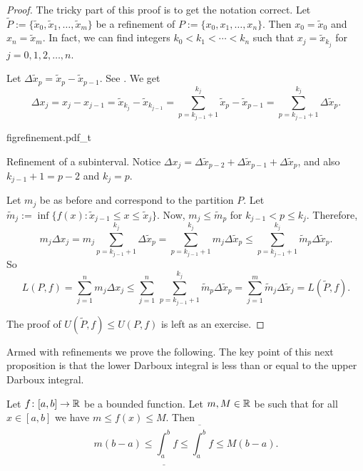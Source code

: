 \begin{proof}
The tricky part of this proof is to get the notation correct.
Let $\widetilde{P} := \{ \widetilde{x}_0, \widetilde{x}_1, \ldots,
\widetilde{x}_m \}$ be
a refinement of 
$P := \{ x_0, x_1, \ldots, x_n \}$.  Then
$x_0 = \widetilde{x}_0$ and 
$x_n = \widetilde{x}_m$.  In fact, we can find integers
$k_0 < k_1 < \cdots < k_n$ such that $x_j = \widetilde{x}_{k_j}$ for
$j=0,1,2,\ldots,n$.

Let $\Delta \widetilde{x}_p = \widetilde{x}_p - \widetilde{x}_{p-1}$.
See .
We get 
\begin{equation*}
\Delta x_j
=
x_j - x_{j-1} =
\widetilde{x}_{k_j} - \widetilde{x}_{k_{j-1}} =
\sum_{p=k_{j-1}+1}^{k_j} 
\widetilde{x}_{p} - \widetilde{x}_{p-1}
=
\sum_{p=k_{j-1}+1}^{k_j} \Delta \widetilde{x}_p .
\end{equation*}
\begin{myfigureht}
{figrefinement.pdf_t}
\caption{Refinement of a subinterval.  Notice $\Delta x_j =
\Delta \widetilde{x}_{p-2} +
\Delta \widetilde{x}_{p-1} +
\Delta \widetilde{x}_{p}$,
and also
$k_{j-1}+1 = p-2$ and
$k_{j} = p$.\label{fig:refinement}}
\end{myfigureht}

Let $m_j$ be as before and correspond to the partition $P$.
Let $\widetilde{m}_j := \inf \{ f(x) : \widetilde{x}_{j-1} \leq x \leq
\widetilde{x}_j \}$.
Now, $m_j \leq \widetilde{m}_p$ for $k_{j-1} < p \leq k_j$.  Therefore,
\begin{equation*}
m_j \Delta x_j
=
m_j \sum_{p=k_{j-1}+1}^{k_j} \Delta \widetilde{x}_p
=
\sum_{p=k_{j-1}+1}^{k_j} m_j \Delta \widetilde{x}_p
\leq
\sum_{p=k_{j-1}+1}^{k_j} \widetilde{m}_p \Delta \widetilde{x}_p .
\end{equation*}
So
\begin{equation*}
L(P,f) =
\sum_{j=1}^n m_j \Delta x_j
\leq
\sum_{j=1}^n \,
\sum_{p=k_{j-1}+1}^{k_j} \widetilde{m}_p \Delta \widetilde{x}_p
=
\sum_{j=1}^m
\widetilde{m}_j \Delta \widetilde{x}_j = L(\widetilde{P},f).
\end{equation*}

The proof of $U(\widetilde{P},f) \leq U(P,f)$ is left as an exercise.
\end{proof}

Armed with refinements we prove the following.
The key point of this next proposition is that
the lower Darboux integral is less than or equal to the upper Darboux
integral.

\begin{prop} \label{intulbound:prop}
Let $f \colon [a,b] \to {\mathbb{R}}$ be a bounded function.  Let $m, M \in {\mathbb{R}}$ be 
such that for all $x \in [a,b]$ we have $m \leq f(x) \leq M$.  Then
\begin{equation}
\label{intulbound:eq}
m(b-a) \leq
\underline{\int_a^b} f \leq \overline{\int_a^b} f
\leq M(b-a) .
\end{equation}
\end{prop}


